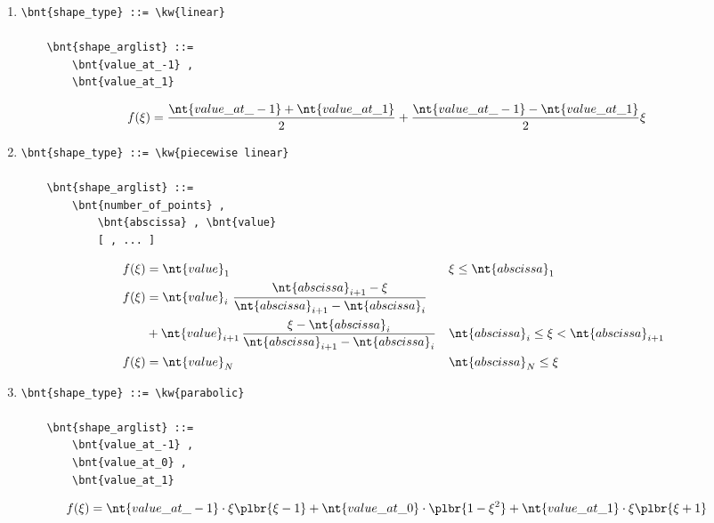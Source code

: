 \begin{enumerate}
    \item {}
\begin{Verbatim}[commandchars=\\\{\}]
    \bnt{shape_type} ::= \kw{linear}

    \bnt{shape_arglist} ::=
        \bnt{value_at_-1} , 
        \bnt{value_at_1}
\end{Verbatim}
\begin{align}
	f(\xi) &= \frac{\nt{value\_at\_-1} + \nt{value\_at\_1}}{2}
		+ \frac{\nt{value\_at\_-1} - \nt{value\_at\_1}}{2} \xi
\end{align}

    \item {}
\begin{Verbatim}[commandchars=\\\{\}]
    \bnt{shape_type} ::= \kw{piecewise linear}

    \bnt{shape_arglist} ::=
        \bnt{number_of_points} , 
            \bnt{abscissa} , \bnt{value}
            [ , ... ]
\end{Verbatim}
\begin{subequations}
\begin{align}
	f(\xi) &= \nt{value}_1	&& \xi \le \nt{abscissa}_1
	\\
	f(\xi) &=
		\nt{value}_i \, \, \frac{\nt{abscissa}_{i+1} - \xi}{\nt{abscissa}_{i+1} - \nt{abscissa}_i}
	\nonumber \\
		&
		+ \nt{value}_{i+1} \, \frac{\xi - \nt{abscissa}_i}{\nt{abscissa}_{i+1} - \nt{abscissa}_i}
		&& \nt{abscissa}_i \le \xi < \nt{abscissa}_{i+1}
	\\
	f(\xi) &= \nt{value}_N	&& \nt{abscissa}_N \le \xi
\end{align}
\end{subequations}

    \item {}
\begin{Verbatim}[commandchars=\\\{\}]
    \bnt{shape_type} ::= \kw{parabolic}

    \bnt{shape_arglist} ::=
        \bnt{value_at_-1} , 
        \bnt{value_at_0} , 
        \bnt{value_at_1}
\end{Verbatim}
\begin{align}
	f(\xi) &= \nt{value\_at\_-1} \cdot \xi\plbr{\xi - 1}
		+ \nt{value\_at\_0} \cdot \plbr{1 - \xi^2}
		+ \nt{value\_at\_1} \cdot \xi\plbr{\xi + 1}
\end{align}

\end{enumerate}
